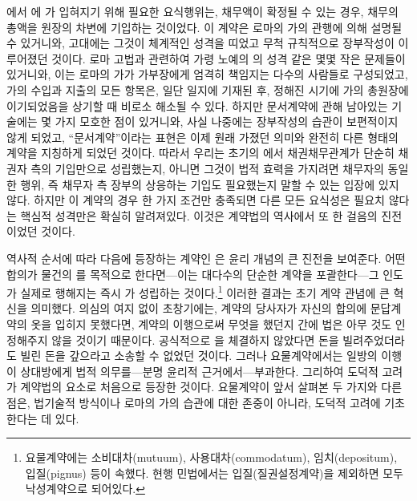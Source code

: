 에서 에 가 입혀지기 위해 필요한
요식행위는,
채무액이 확정될 수 있는 경우,
채무의 총액을
원장의 차변에 기입하는 것이었다.
이 계약은 로마의 가의 관행에 의해 설명될 수 있거니와,
고대에는 그것이 체계적인 성격을 띠었고 무척 규칙적으로 장부작성이
이루어졌던 것이다.
로마 고법과 관련하여
가령 노예의 의 성격 같은
몇몇 작은 문제들이 있거니와,
이는
로마의 가가 가부장에게 엄격히 책임지는 다수의 사람들로
구성되었고,
가의 수입과 지출의 모든 항목은,
일단 일지에 기재된 후,
정해진 시기에
가의 총원장에 이기되었음을 상기할 때
비로소 해소될 수 있다.
하지만 문서계약에 관해 남아있는 기술에는
몇 가지 모호한 점이 있거니와,
사실
나중에는
장부작성의 습관이
보편적이지 않게 되었고,
``문서계약''이라는 표현은 이제 원래 가졌던 의미와 완전히
다른 형태의 계약을 지칭하게 되었던 것이다.
따라서 우리는
초기의 에서
채권채무관계가 단순히 채권자 측의 기입만으로 성립했는지,
아니면
그것이 법적 효력을 가지려면
채무자의 동일한 행위, 즉 채무자 측 장부의 상응하는 기입도 필요했는지
말할 수 있는 입장에 있지 않다.
하지만
이 계약의 경우
한 가지 조건만 충족되면 다른 모든 요식성은 필요치 않다는
핵심적 성격만은 확실히 알려져있다.
이것은 계약법의 역사에서 또 한 걸음의 진전이었던 것이다.

역사적 순서에 따라 다음에 등장하는 계약인 은
윤리 개념의 큰 진전을 보여준다.
어떤 합의가 물건의 를 목적으로 한다면---이는
대다수의 단순한 계약을 포괄한다---그 인도가 실제로 행해지는 즉시
가 성립하는 것이다.\footnote{%
  요물계약에는 소비대차(mutuum),
  사용대차(commodatum), 임치(depositum), 입질(pignus) 등이 속했다.
  현행 민법에서는 입질(질권설정계약)을 제외하면
  모두 낙성계약으로 되어있다. }
이러한 결과는 초기 계약 관념에 큰 혁신을 의미했다.
의심의 여지 없이 초창기에는,
계약의 당사자가 자신의 합의에 문답계약의 옷을 입히지 못했다면,
계약의 이행으로써 무엇을 했던지 간에
법은 아무 것도 인정해주지 않을 것이기 때문이다.
공식적으로 을 체결하지 않았다면
돈을 빌려주었더라도 빌린 돈을 갚으라고 소송할 수 없었던 것이다.
그러나 요물계약에서는
일방의 이행이 상대방에게 법적 의무를---분명 윤리적 근거에서---부과한다.
그리하여 도덕적 고려가 계약법의 요소로 처음으로 등장한 것이다.
요물계약이
앞서 살펴본 두 가지와 다른 점은,
법기술적 방식이나 로마의 가의 습관에 대한 존중이 아니라,
도덕적 고려에 기초한다는 데 있다.

